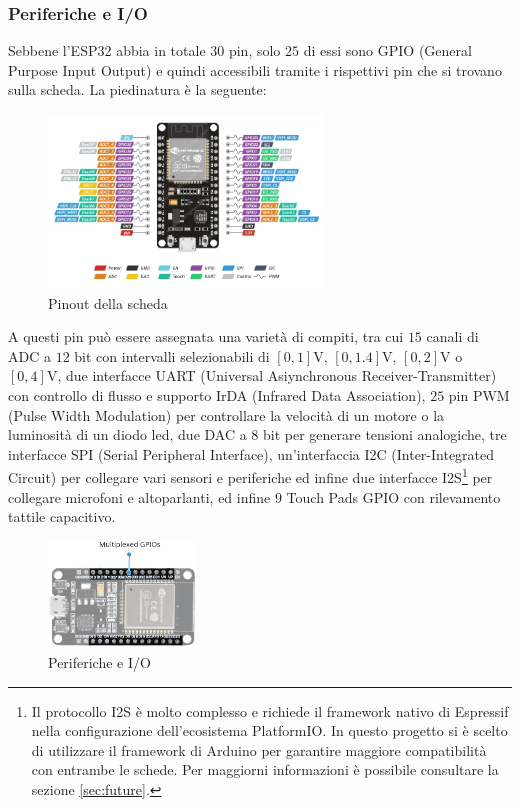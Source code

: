 \documentclass[a4paper,12pt]{report}  %
\begin{document}
\subsubsection{Periferiche e I/O}
Sebbene l'ESP32 abbia in totale $30$ pin, solo $25$ di essi sono GPIO (General Purpose Input Output) e quindi accessibili tramite i rispettivi pin che si trovano sulla scheda.
La piedinatura è la seguente:

\begin{figure}[h]
    \centering
    \includegraphics[width=0.65\textwidth]{imgs/pinout.png}
    \caption{Pinout della scheda}
    \label{fig:ESP32-pinout}
\end{figure}

A questi pin può essere assegnata una varietà di compiti, tra cui $15$ canali di ADC a $12$ bit con intervalli selezionabili di $[0, 1] \text{V}$, $[0, 1.4] \text{V}$, $[0, 2] \text{V}$ o $[0, 4] \text{V}$, due interfacce UART (Universal Asiynchronous Receiver-Transmitter) con controllo di flusso e supporto IrDA (Infrared Data Association), $25$ pin PWM (Pulse Width Modulation) per controllare la velocità di un motore o la luminosità di un diodo led, due DAC a $8$ bit per generare tensioni analogiche, tre interfacce SPI (Serial Peripheral Interface), un'interfaccia I2C (Inter-Integrated Circuit) per collegare vari sensori e periferiche ed infine due interfacce I2S\footnote{Il protocollo I2S è molto complesso e richiede il framework nativo di Espressif nella configurazione dell'ecosistema PlatformIO. In questo progetto si è scelto di utilizzare il framework di Arduino per garantire maggiore compatibilità con entrambe le schede. Per maggiorni informazioni è possibile consultare la sezione \ref{sec:future}.} per collegare microfoni e altoparlanti, ed infine $9$ Touch Pads GPIO con rilevamento tattile capacitivo.

\begin{figure}[h]
    \centering
    \includegraphics[width=0.35\textwidth]{imgs/ESP32-Hardware-Specifications-Multiplexed-GPIO-pins.jpg}
    \caption{Periferiche e I/O}
    \label{fig:ESP32-I/O}
\end{figure}
\end{document}
